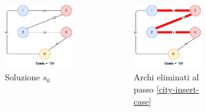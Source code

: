 \documentclass[9pt]{beamer}
\begin{document}
\begin{frame}[allowframebreaks]{\subsecname}
{      \begin{columns}[T,onlytextwidth]
		\begin{figure}[h]
		\centering
		\includegraphics[height=0.25\textheight]
		{../images/graph-greedy-request-order-solution-tsppd-with-two-customers}	
		\caption{Soluzione $s_0$}
		\end{figure}
		\begin{figure}[h]
		\centering
		\includegraphics[height=0.25\textheight]
		{../images/city-swap}	
		\caption{Archi eliminati al passo \ref{city-insert-case}}
		\end{figure}
		\begin{figure}[h]
		\centering

\end{figure}
\end{columns}}
\end{frame}
\end{document}
